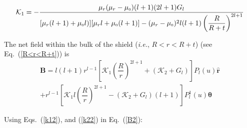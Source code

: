 

\begin{equation}\label{k1}
\mathcal{K}_1=-\frac{\mu_r(\mu_r-\mu_{\scriptscriptstyle 0})(l+1) (2l+1)G_l}{[\mu_r(l+1)+\mu_{\scriptscriptstyle 0} l)][\mu_r l+\mu_{\scriptscriptstyle 0}(l+1)]-(\mu_r-\mu_{\scriptscriptstyle 0})^2 l(l+1)\left(\dfrac{R}{R+t}\right)^{2l+1}}
\end{equation}


The net field  within the bulk of the shield (\textit{i.e.}, $R<r<R+t$) (see Eq.~(\ref{R<r<R+t}))  is 
\begin{multline}\label{B2}
\bm B= l(l+1)r^{l-1}\left[\mathcal{K}_1 \left(\dfrac{R}{r}\right)^{2l+1}+(\mathcal{K}_2+G_l)\right] P_l(u) \bm{\hat{r}} \\+r^{l-1} \left[\mathcal{K}_1 l\left(\dfrac{R}{r}\right)^{2l+1}-(\mathcal{K}_2+G_l)(l+1) \right] P_l^1(u) \bm{\hat{\theta}}
\end{multline}



Using Eqs.~(\ref{k12}), and (\ref{k22}) in Eq.~(\ref{B2}):


